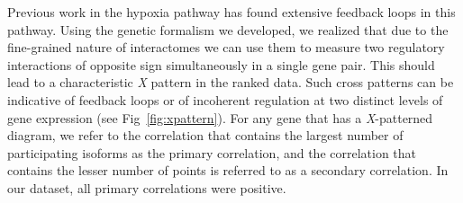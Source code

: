 \documentclass[9pt,twocolumn,twoside]{pnas-new}
\begin{document}
Previous work in the hypoxia pathway has found extensive feedback loops in this pathway. Using the genetic formalism we developed, we realized that due to the fine-grained nature of interactomes we can use them to measure two regulatory interactions of opposite sign simultaneously in a single gene pair.
This should lead to a characteristic \emph{X} pattern in the ranked data. Such cross patterns can be indicative of feedback loops or of incoherent regulation at two distinct levels of gene expression (see Fig~\ref{fig:xpattern}). For any gene that has a \emph{X}-patterned diagram, we refer to the correlation that contains the largest number of participating isoforms as the primary correlation, and the correlation that contains the lesser number of points is referred to as a secondary correlation. In our dataset, all primary correlations were positive.
\end{document}
